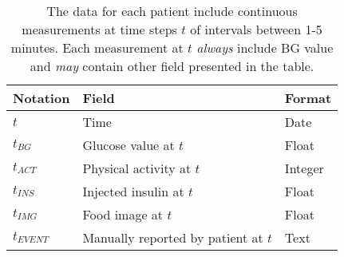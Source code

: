 \medskip
\begin{table}[ht!]
\begin{center}
  \begin{tabular}{lll}
  \textbf{Notation} &
  \textbf{Field} &
  \textbf{Format} \\
  \hline
  $t$ &
  Time &
  Date \\
  $t_{BG}$ &
  Glucose value at $t$ &
  Float \\
  $t_{ACT}$ &
  Physical activity at $t$ &
  Integer \\
  $t_{INS}$ &
  Injected insulin at $t$ &
  Float \\
  $t_{IMG}$ &
  Food image at $t$ &
  Float \\
  $t_{EVENT}$ &
  Manually reported by patient at $t$ &
  Text \\
  \hline
  \end{tabular}
  \caption[]
  {\small The data for each patient include continuous measurements at time steps $t$ of intervals between 1-5 minutes. Each measurement at $t$ \textit{always} include BG value and \textit{may} contain other field presented in the table.}
  \label{table:data_description}
\end{center}
\end{table}
